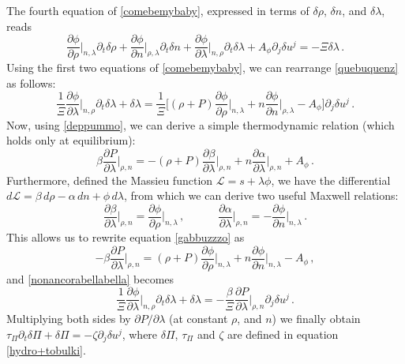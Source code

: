 \documentclass[a4paper, amsfonts, amssymb, amsmath, reprint, showkeys, nofootinbib, twoside, onecolumn,notitlepage]{revtex4-1}
\newcommand{\spc}{\quad \quad \quad}
\begin{document}
The fourth equation of \eqref{comebemybaby}, expressed in terms of $\delta \rho$, $\delta n$, and $\delta \lambda$, reads
\begin{equation}\label{quebuquenz}
\dfrac{\partial \phi}{\partial \rho}\bigg|_{n,\lambda} \partial_t \delta \rho + \dfrac{\partial \phi}{\partial n}\bigg|_{\rho,\lambda} \partial_t\delta n +\dfrac{\partial \phi}{\partial \lambda}\bigg|_{n,\rho} \partial_t\delta \lambda + A_\phi \partial_j \delta u^j = -\Xi \delta \lambda \, .
\end{equation}
Using the first two equations of \eqref{comebemybaby}, we can rearrange \eqref{quebuquenz} as follows:
\begin{equation}\label{nonancorabellabella}
\dfrac{1}{\Xi}\dfrac{\partial \phi}{\partial \lambda}\bigg|_{n,\rho} \partial_t\delta \lambda + \delta \lambda =\dfrac{1}{\Xi} \bigg[(\rho+P)\dfrac{\partial \phi}{\partial \rho}\bigg|_{n,\lambda}  + n \dfrac{\partial \phi}{\partial n}\bigg|_{\rho,\lambda}-A_\phi \bigg]\partial_j \delta u^j \, .
\end{equation}
Now, using \eqref{deppummo}, we can derive a simple thermodynamic relation \cite{Hydro+2018} (which holds only at equilibrium):
\begin{equation}\label{gabbuzzzo}
\beta \dfrac{\partial P}{\partial \lambda}\bigg|_{\rho,n} = -(\rho+P) \dfrac{\partial \beta}{\partial \lambda}\bigg|_{\rho,n} + n \dfrac{\partial \alpha}{\partial \lambda}\bigg|_{\rho,n} +A_\phi \, .
\end{equation}
Furthermore, defined the Massieu function $\mathcal{L}=s+\lambda \phi$, we have the differential $d\mathcal{L}=\beta \, d\rho -\alpha \, dn + \phi \, d \lambda$, from which we can derive two useful Maxwell relations:
\begin{equation}
\dfrac{\partial \beta}{\partial \lambda}\bigg|_{\rho,n}=\dfrac{\partial \phi}{\partial \rho}\bigg|_{n,\lambda} \, ,  \spc \dfrac{\partial \alpha}{\partial \lambda}\bigg|_{\rho,n}=-\dfrac{\partial \phi}{\partial n}\bigg|_{n,\lambda} \, . 
\end{equation}
This allows us to rewrite equation \eqref{gabbuzzzo} as 
\begin{equation}
-\beta \dfrac{\partial P}{\partial \lambda}\bigg|_{\rho,n} = (\rho+P)\dfrac{\partial \phi}{\partial \rho}\bigg|_{n,\lambda} + n \dfrac{\partial \phi}{\partial n}\bigg|_{n,\lambda} -A_\phi \, ,
\end{equation}
and \eqref{nonancorabellabella} becomes
\begin{equation}
\dfrac{1}{\Xi}\dfrac{\partial \phi}{\partial \lambda}\bigg|_{n,\rho} \partial_t\delta \lambda + \delta \lambda =-\dfrac{\beta}{\Xi} \dfrac{\partial P}{\partial \lambda}\bigg|_{\rho,n} \partial_j \delta u^j \, .
\end{equation}
Multiplying both sides by $\partial P/\partial \lambda$ (at constant $\rho$, and $n$) we finally obtain $\tau_\Pi \partial_t \delta \Pi+\delta \Pi=-\zeta \partial_j \delta u^j$, where $\delta \Pi$, $\tau_\Pi$ and $\zeta$ are defined in equation \eqref{hydro+tobulki}.






\label{lastpage}
\end{document}
